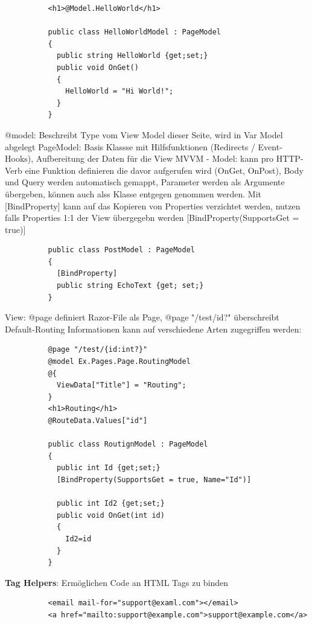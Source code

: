 \documentclass[10pt,landscape]{article}
\begin{document}
\begin{multicols}{3}
\begin{lstlisting}
          <h1>@Model.HelloWorld</h1>

          public class HelloWorldModel : PageModel
          {
            public string HelloWorld {get;set;}
            public void OnGet()
            {
              HelloWorld = "Hi World!";
            }
          }
        \end{lstlisting}
        @model: Beschreibt Type vom View Model dieser Seite, wird in Var Model abgelegt
        PageModel: Basis Klassse mit Hilfsfunktionen (Redirects / Event-Hooks), Aufbereitung der Daten für die View
        MVVM - Model: kann pro HTTP-Verb eine Funktion definieren die davor aufgerufen wird (OnGet, OnPost), Body und Query werden automatisch gemappt, Parameter werden als Argumente übergeben, können auch alss Klasse entgegen genommen werden.
        Mit [BindProperty] kann auf das Kopieren von Properties verzichtet werden, nutzen falls Properties 1:1 der View übergegebn werden [BindProperty(SupportsGet = true)]
        \begin{lstlisting}
          public class PostModel : PageModel
          {
            [BindProperty]
            public string EchoText {get; set;}
          }
        \end{lstlisting}
        View: @page definiert Razor-File als Page, @page "/test/{id?}" überschreibt Default-Routing Informationen
        kann auf verschiedene Arten zugegriffen werden:
        \begin{lstlisting}
          @page "/test/{id:int?}"
          @model Ex.Pages.Page.RoutingModel
          @{
            ViewData["Title"] = "Routing";
          }
          <h1>Routing</h1>
          @RouteData.Values["id"]

          public class RoutignModel : PageModel
          {
            public int Id {get;set;}
            [BindProperty(SupportsGet = true, Name="Id")]

            public int Id2 {get;set;}
            public void OnGet(int id)
            {
              Id2=id
            }
          }
        \end{lstlisting}
        \textbf{Tag Helpers}: Ermöglichen Code an HTML Tags zu binden
        \begin{lstlisting}
          <email mail-for="support@examl.com"></email>
          <a href="mailto:support@example.com">support@example.com</a>


\end{lstlisting}
\end{multicols}
\end{document}

